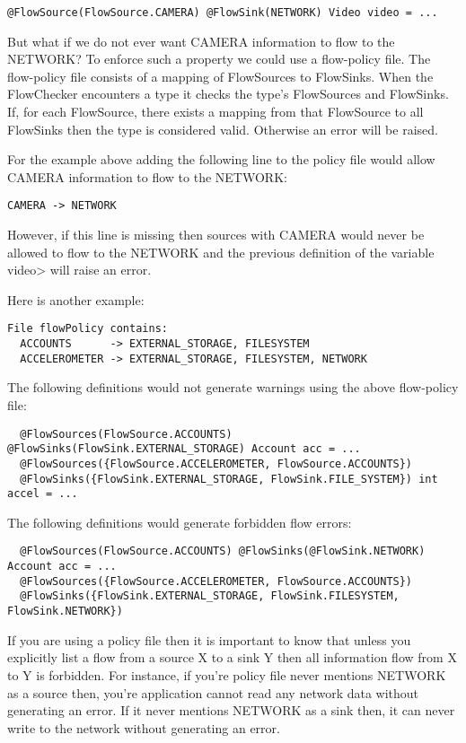 \begin{Verbatim}
@FlowSource(FlowSource.CAMERA) @FlowSink(NETWORK) Video video = ...
\end{Verbatim}

But what if we do not ever want CAMERA information to flow to the
NETWORK? To enforce such a property we could use a flow-policy file.
The flow-policy file consists of a mapping of
FlowSources to FlowSinks.  When the FlowChecker encounters a type
it checks the type's FlowSources and FlowSinks.  If, for each FlowSource,
there exists a mapping from that FlowSource to all FlowSinks then
the type is considered valid.  Otherwise an error will be raised.

For the example above adding the following line to the policy
file would allow CAMERA information to flow to the NETWORK:

\begin{Verbatim}
CAMERA -> NETWORK
\end{Verbatim}

However, if this line is missing then sources with CAMERA
would never be allowed to flow to the NETWORK and the previous
definition of the variable \<video> will raise an error.

Here is another example:

\begin{Verbatim}
File flowPolicy contains:
  ACCOUNTS      -> EXTERNAL_STORAGE, FILESYSTEM
  ACCELEROMETER -> EXTERNAL_STORAGE, FILESYSTEM, NETWORK
\end{Verbatim}

The following definitions would not generate warnings using the above flow-policy file:
\begin{Verbatim}
  @FlowSources(FlowSource.ACCOUNTS) @FlowSinks(FlowSink.EXTERNAL_STORAGE) Account acc = ...
  @FlowSources({FlowSource.ACCELEROMETER, FlowSource.ACCOUNTS})
  @FlowSinks({FlowSink.EXTERNAL_STORAGE, FlowSink.FILE_SYSTEM}) int accel = ...
\end{Verbatim}

The following definitions would generate forbidden flow errors:
\begin{Verbatim}
  @FlowSources(FlowSource.ACCOUNTS) @FlowSinks(@FlowSink.NETWORK) Account acc = ...
  @FlowSources({FlowSource.ACCELEROMETER, FlowSource.ACCOUNTS})
  @FlowSinks({FlowSink.EXTERNAL_STORAGE, FlowSink.FILESYSTEM, FlowSink.NETWORK})
\end{Verbatim}

If you are using a policy file then it is important to know that unless
you explicitly list a flow from a source X to a sink Y then all
information flow from X to Y is forbidden.  For instance,
if you're policy file never mentions NETWORK as a source then, you're application
cannot read any network data without generating an error.  If it never
mentions NETWORK as a sink then, it can never write to the network without
generating an error.

